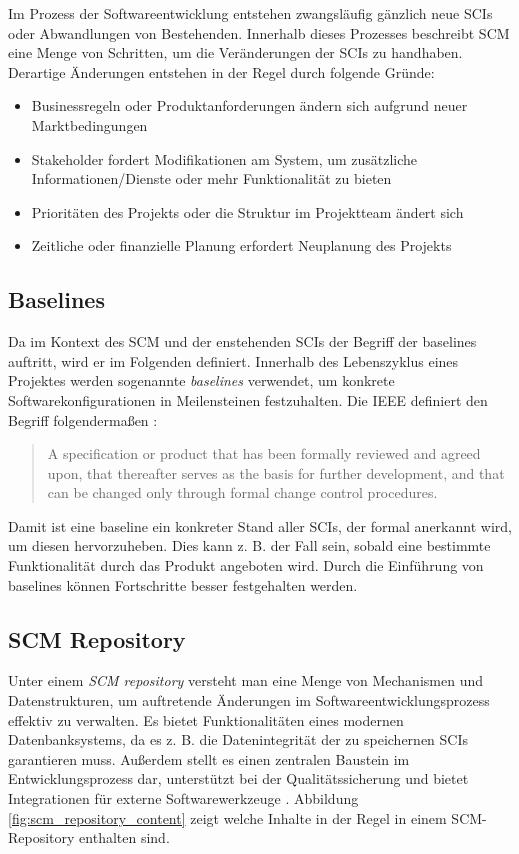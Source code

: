 \documentclass[runningheads,a4paper]{uwsese}
\begin{document}
Im Prozess der Softwareentwicklung entstehen zwangsläufig gänzlich neue SCIs oder
Abwandlungen von Bestehenden.
Innerhalb dieses Prozesses beschreibt SCM eine Menge von Schritten, um die
Veränderungen der SCIs zu handhaben. Derartige Änderungen entstehen in
der Regel durch folgende Gründe:

\begin{itemize}
	\item Businessregeln oder Produktanforderungen ändern sich aufgrund neuer Marktbedingungen
	\item Stakeholder fordert Modifikationen am System, um zusätzliche Informationen/Dienste
        oder mehr Funktionalität zu bieten
	\item Prioritäten des Projekts oder die Struktur im Projektteam ändert sich
	\item Zeitliche oder finanzielle Planung erfordert Neuplanung des Projekts
\end{itemize}

\subsection{Baselines}
Da im Kontext des SCM und der enstehenden SCIs der Begriff der baselines auftritt,
wird er im Folgenden definiert.
Innerhalb des Lebenszyklus eines Projektes werden sogenannte {\em baselines}
verwendet, um konkrete Softwarekonfigurationen in Meilensteinen festzuhalten.
Die IEEE definiert den Begriff folgendermaßen \cite[p. 588]{Pressman:2009:SEP:1593949}:

\begin{quote}
  A specification or product that has been formally reviewed and agreed upon,
  that thereafter serves as the basis for further development, and that can be
  changed only through formal change control procedures.
\end{quote}

Damit ist eine baseline ein konkreter Stand aller SCIs, der formal anerkannt
wird, um diesen hervorzuheben. Dies kann z. B. der Fall sein, sobald eine bestimmte
Funktionalität durch das Produkt angeboten wird. Durch die Einführung von baselines
können Fortschritte besser festgehalten werden.

\subsection{SCM Repository}
Unter einem {\em SCM repository} versteht man eine Menge von Mechanismen und
Datenstrukturen, um auftretende Änderungen im Softwareentwicklungsprozess
effektiv zu verwalten. Es bietet Funktionalitäten eines modernen Datenbanksystems,
da es z. B. die Datenintegrität der zu speichernen SCIs garantieren muss.
Außerdem stellt es einen zentralen Baustein im Entwicklungsprozess dar, unterstützt
bei der Qualitätssicherung und bietet Integrationen für externe Softwarewerkzeuge
\cite[p. 590f]{Pressman:2009:SEP:1593949}. Abbildung \ref{fig:scm_repository_content}
zeigt welche Inhalte in der Regel in einem SCM-Repository enthalten sind.
\end{document}
